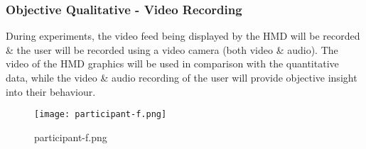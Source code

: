 
\subsubsection{Objective Qualitative - Video Recording}
During experiments, the video feed being displayed by the HMD will be recorded \& the user will be recorded using a video camera (both video \& audio). The video of the HMD graphics will be used in comparison with the quantitative data, while the video \& audio recording of the user will provide objective insight into their behaviour.




\begin{figure}[h]
	\begin{center}
		\texttt{[image: participant-f.png]}
		\caption{participant-f.png}
		\label{participant-f.png}
	\end{center}
\end{figure}

